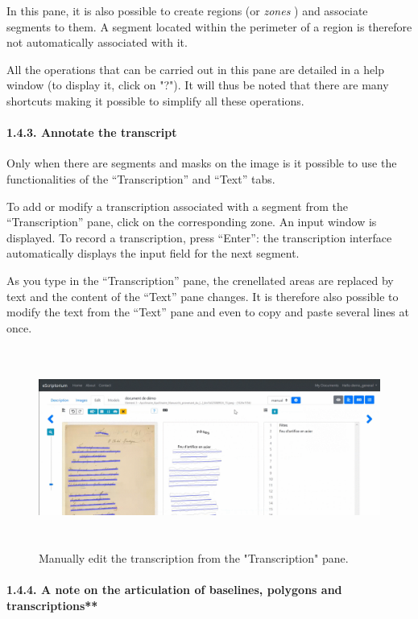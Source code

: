 \documentclass[
]{book}
\begin{document}
In this pane, it is also possible to create regions (or \emph{zones} ) and
associate segments to them. A segment located within the perimeter of a
region is therefore not automatically associated with it.

All the operations that can be carried out in this pane are detailed in
a help window (to display it, click on "?"). It will thus be noted
that there are many shortcuts making it possible to simplify all these
operations.

\hypertarget{annotate-the-transcript}{%
\paragraph{1.4.3. Annotate the transcript}\label{annotate-the-transcript}}

Only when there are segments and masks on the image is it possible to
use the functionalities of the ``Transcription'' and ``Text'' tabs.

To add or modify a transcription associated with a segment from the
``Transcription'' pane, click on the corresponding zone. An input window
is displayed. To record a transcription, press ``Enter'': the
transcription interface automatically displays the input field for the
next segment.

As you type in the ``Transcription'' pane, the crenellated areas are
replaced by text and the content of the ``Text'' pane changes. It is
therefore also possible to modify the text from the ``Text'' pane and even
to copy and paste several lines at once.

\begin{figure}
\centering
\includegraphics[width=6.5in,height=2.58333in]{img/eScrTut/image12.gif}
\caption{Manually edit the transcription from the "Transcription" pane.}
\end{figure}

\hypertarget{a-note-on-the-articulation-of-baselines-polygons-and-transcriptions}{%
\paragraph{1.4.4. A note on the articulation of baselines, polygons and transcriptions**}\label{a-note-on-the-articulation-of-baselines-polygons-and-transcriptions}}
\end{document}
